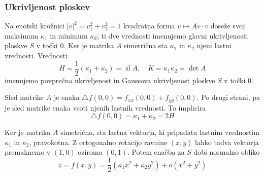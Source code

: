 \documentclass[8pt]{beamer}
\theoremstyle{definition}
\theoremstyle{remark}
\theoremstyle{plain}
\numberwithin{equation}{section}  %
\begin{document}
\begin{frame}
    \frametitle{Ukrivljenost ploskev}

    Na enotski krožnici $|v|^2=v_1^2+v_2^2=1$ kvadratna forma $v \mapsto A v \cdot v$ doseže svoj maksimum $\kappa_1$ in minimum $\kappa_2$; ti dve vrednosti imenujemo \textcolor{red1}{glavni ukrivljenosti} ploskve $S$ v točki $0$. Ker je matrika $A$ simetrična sta $\kappa_1$ in $\kappa_2$ njeni lastni vrednosti. Vrednosti 
    \begin{equation*}
        H=\frac{1}{2}(\kappa_1+\kappa_2)=\operatorname{sl} A, \quad K=\kappa_1 \kappa_2=\operatorname{det} A
    \end{equation*}
    imenujemo \textcolor{red1}{povprečna ukrivljenost} in \textcolor{red1}{Gaussova ukrivljenost} ploskve $S$ v točki $0$. 

    \vspace{0.8em}

    Sled matrike $A$ je enaka $\bigtriangleup f(0,0)=f_{x x}(0,0)+f_{y y}(0,0)$. Po drugi strani, pa je sled matrike enaka vsoti njenih lastnih vrednosti. To implicira 
    \begin{equation*}
        \bigtriangleup f(0,0)=\kappa_1+\kappa_2=2H 
    \end{equation*}

    Ker je matrika $A$ simetrična, sta lastna vektorja, ki pripadata lastnim vrednostim $\kappa_1$ in $\kappa_2$, pravokotna. Z ortogonalno rotacijo ravnine $(x,y)$ lahko tadva vektorja premaknemo v $(1,0)$ oziroma $(0,1)$. Potem enačba za $S$ dobi normalno obliko 
    \begin{equation*}
        z=f(x, y)=\frac{1}{2}\left(\kappa_1 x^2+\kappa_2 y^2\right)+o\left(x^2+y^2\right)
    \end{equation*}

\end{frame}
\end{document}
